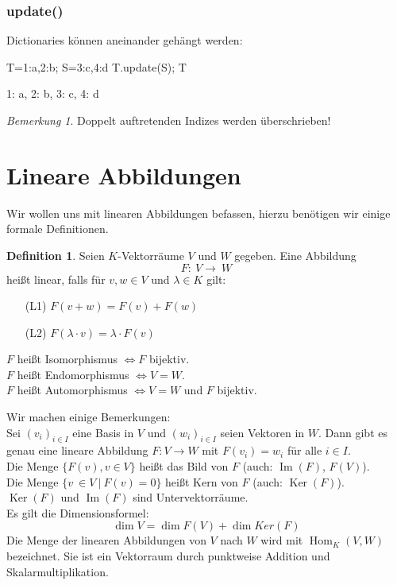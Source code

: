 \documentclass[fontsize=12pt,paper=a4,twoside,bibtotoc,idxtotoc,
liststotoc,pagesize,BCOR1.2cm,DIV15,chapterprefix,pagesize=pdftex]{scrbook}
\theoremstyle{plain}
\theoremstyle{definition}
\newtheorem{df}[equation]{Definition}
\theoremstyle{remark}
\newtheorem{bem}[equation]{Bemerkung}
\begin{document}
\subsubsection{update()}
Dictionaries können aneinander gehängt werden:
\begin{sagein}
T={1:a,2:b}; S={3:c,4:d}
T.update(S); T
\end{sagein}
\begin{sage}
{1: a, 2: b, 3: c, 4: d}
\end{sage}
\begin{bem}
Doppelt auftretenden Indizes werden überschrieben!
\end{bem}

\section{Lineare Abbildungen}
Wir wollen uns mit linearen Abbildungen befassen, hierzu benötigen wir einige formale Definitionen.
\begin{df}
Seien $K$-Vektorräume $V$ und $W$ gegeben. Eine Abbildung
\[ F: \ V \rightarrow \ W \]
heißt linear, falls für $v,w\in V$ und $\lambda \in K$ gilt:
\begin{itemize}
 \item[(L1)] $F(v+w)=F(v)+F(w)$
 \item[(L2)] $F(\lambda \cdot v)=\lambda \cdot F(v)$
\end{itemize} 
$F$ heißt Isomorphismus $\Longleftrightarrow F$ bijektiv.\\
$F$ heißt Endomorphismus $\Longleftrightarrow V=W$.\\
$F$ heißt Automorphismus $\Longleftrightarrow V=W$ und $F$ bijektiv.
\end{df}
Wir machen einige Bemerkungen:\\
Sei $(v_i)_{i\in I}$ eine Basis in $V$ und $(w_i)_{i\in I}$
seien Vektoren in $W$. Dann gibt es genau eine lineare Abbildung $F:V
\rightarrow W$ mit $F(v_i)=w_i$ für alle $i \in I$.\\
Die Menge $\{ F(v), v \in V \}$ heißt das Bild von $F$ (auch: $\mathop{Im}(F)$, $F(V)$).\\
Die Menge $\{v \ \in V \ | \ F(v)=0 \}$ heißt Kern von $F$ (auch: $\mathop{Ker}(F)$).\\
$\mathop{Ker}(F)$ und $\mathop{Im}(F)$ sind Untervektorräume.\\
Es gilt die Dimensionsformel:
\[\dim V = \dim F(V) + \dim Ker(F)\]
Die Menge der linearen Abbildungen von $V$ nach $W$ wird mit $\operatorname{Hom}_K(V,W)$ bezeichnet. 
Sie ist ein Vektorraum durch punktweise Addition und Skalarmultiplikation.
\end{document}
